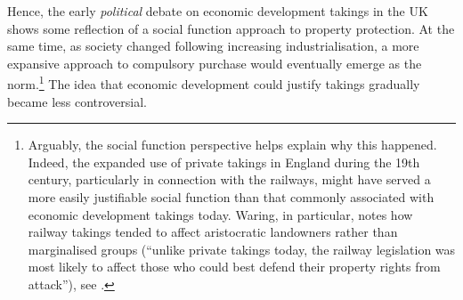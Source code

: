 Hence, the early {\it political} debate on economic development takings in the UK shows some reflection of a social function approach to property protection. At the same time, as society changed following increasing industrialisation, a more expansive approach to compulsory purchase would eventually emerge as the norm.\footnote{Arguably, the social function perspective helps explain why this happened. Indeed, the expanded use of private takings in England during the 19th century, particularly in connection with the railways, might have served a more easily justifiable social function than that commonly associated with economic development takings today. Waring, in particular, notes how railway takings tended to affect aristocratic landowners rather than marginalised groups (``unlike private takings today, the railway legislation was most likely to affect those who could best defend their property rights from attack''), see \cite[111]{waring09}.} The idea that economic development could justify takings gradually became less controversial.

